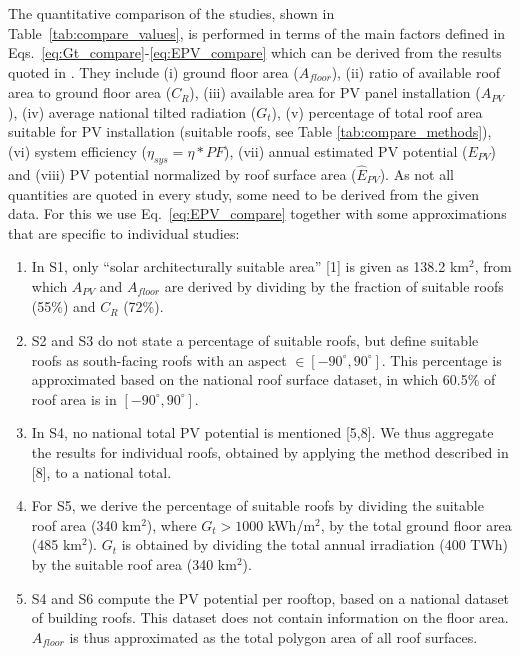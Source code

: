 
The quantitative comparison of the studies, shown in Table~\ref{tab:compare_values}, is performed in terms of the main factors defined in Eqs.~\ref{eq:Gt_compare}-\ref{eq:EPV_compare} which can be derived from the results quoted in \cite{iea_potential_2002,assouline_quantifying_2017,assouline_large-scale_2018,klauser_solarpotentialanalyse_2016,buffat_scalable_2018, walch_big_2020}. They include (i) ground floor area ($A_{\mathit{floor}}$), (ii) ratio of available roof area to ground floor area ($C_R$), (iii) available area for PV panel installation ($A_{PV}$), (iv) average national tilted radiation ($G_t$), (v) percentage of total roof area suitable for PV installation (suitable roofs, see Table \ref{tab:compare_methods}), (vi) system efficiency ($\eta_{sys} = \eta * \mathit{PF}$), (vii) annual estimated PV potential ($E_{PV}$) and (viii) PV potential normalized by roof surface area ($\hat{E}_{PV}$). As not all quantities are quoted in every study, some need to be derived from the given data. For this we use Eq.~\ref{eq:EPV_compare} together with some approximations that are specific to individual studies:

\begin{enumerate}[label=(\alph*)]
    \item In S1, only “solar architecturally suitable area” [1] is given as 138.2 km$^2$, from which $A_{PV}$ and $A_{\mathit{floor}}$ are derived by dividing by the fraction of suitable roofs (55\%) and $C_R$ (72\%).
    \item S2 and S3 do not state a percentage of suitable roofs, but define suitable roofs as south-facing roofs with an aspect $\in [-90^\circ, 90^\circ]$. This percentage is approximated based on the national roof surface dataset, in which 60.5\% of roof area is in $[-90^\circ, 90^\circ]$.
	\item In S4, no national total PV potential is mentioned [5,8]. We thus aggregate the results for individual roofs, obtained by applying the method described in [8], to a national total.
	\item For S5, we derive the percentage of suitable roofs by dividing the suitable roof area (340 km$^2$), where $G_t > 1000$ kWh/m$^2$, by the total ground floor area (485 km$^2$). $G_t$ is obtained by dividing the total annual irradiation (400 TWh) by the suitable roof area (340 km$^2$).  
	\item S4 and S6 compute the PV potential per rooftop, based on a national dataset of building roofs. This dataset does not contain information on the floor area. $A_{\mathit{floor}}$ is thus approximated as the total polygon area of all roof surfaces.
\end{enumerate}
	
